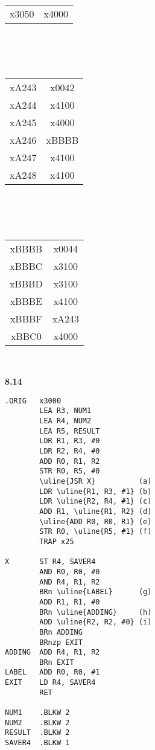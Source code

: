 \documentclass[a4paper,12pt]{article}     %
\begin{document}
\begin{minipage}{\textwidth}
\begin{minipage}[t]{0.45\textwidth}
\begin{tabular}{c|c|}
      \cline{2-2}
      x3050 & x4000\\
      \cline{2-2}
    \end{tabular}\\
    ~\\
    ~\\
    \begin{tabular}{c|c|}
      \cline{2-2}
      xA243 & x0042\\
      \cline{2-2}
      xA244 & x4100\\
      \cline{2-2}
      xA245 & x4000\\
      \cline{2-2}
      xA246 & xBBBB\\
      \cline{2-2}
      xA247 & x4100\\
      \cline{2-2}
      xA248 & x4100\\
      \cline{2-2}
    \end{tabular}\\
    ~\\
    ~\\
    \begin{tabular}{c|c|}
      \cline{2-2}
      xBBBB & x0044\\
      \cline{2-2}
      xBBBC & x3100\\
      \cline{2-2}
      xBBBD & x3100\\
      \cline{2-2}
      xBBBE & x4100\\
      \cline{2-2}
      xBBBF & xA243\\
      \cline{2-2}
      xBBC0 & x4000\\
      \cline{2-2}
    \end{tabular}\\
  \end{minipage}
\end{minipage}


\newpage
\noindent
\textbf{8.14}\\
\linespread{1.2}
\begin{Verbatim}[commandchars=\\\{\}]
.ORIG   x3000
        LEA R3, NUM1
        LEA R4, NUM2
        LEA R5, RESULT
        LDR R1, R3, #0
        LDR R2, R4, #0
        ADD R0, R1, R2
        STR R0, R5, #0
        \uline{JSR X}          (a)
        LDR \uline{R1, R3, #1} (b)
        LDR \uline{R2, R4, #1} (c)
        ADD R1, \uline{R1, R2} (d)
        \uline{ADD R0, R0, R1} (e)
        STR R0, \uline{R5, #1} (f)
        TRAP x25

X       ST R4, SAVER4
        AND R0, R0, #0
        AND R4, R1, R2
        BRn \uline{LABEL}      (g)
        ADD R1, R1, #0
        BRn \uline{ADDING}     (h)
        ADD \uline{R2, R2, #0} (i)
        BRn ADDING
        BRnzp EXIT
ADDING  ADD R4, R1, R2
        BRn EXIT
LABEL   ADD R0, R0, #1
EXIT    LD R4, SAVER4
        RET

NUM1    .BLKW 2
NUM2    .BLKW 2
RESULT  .BLKW 2
SAVER4  .BLKW 1
\end{Verbatim}
\end{document}
